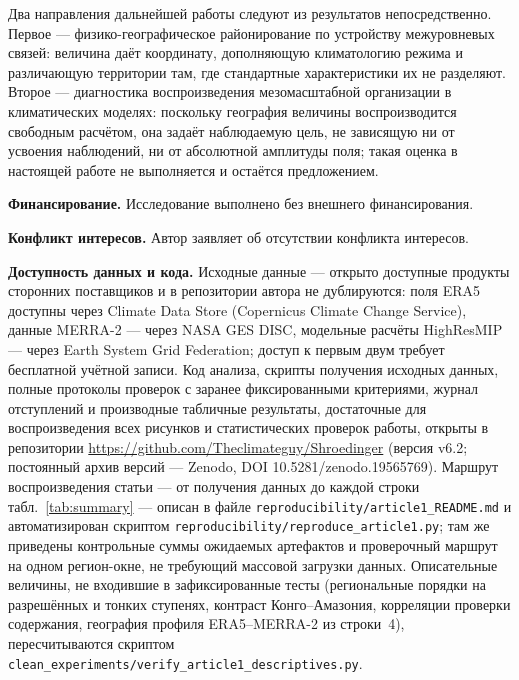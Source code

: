 \documentclass[11pt,a4paper]{article}
\begin{document}
Два направления дальнейшей работы следуют из результатов непосредственно. Первое --- физико-географическое районирование по устройству межуровневых связей: величина даёт координату, дополняющую климатологию режима и различающую территории там, где стандартные характеристики их не разделяют. Второе --- диагностика воспроизведения мезомасштабной организации в климатических моделях: поскольку география величины воспроизводится свободным расчётом, она задаёт наблюдаемую цель, не зависящую ни от усвоения наблюдений, ни от абсолютной амплитуды поля; такая оценка в настоящей работе не выполняется и остаётся предложением.

\bigskip
\noindent\textbf{Финансирование.} Исследование выполнено без внешнего финансирования.

\smallskip
\noindent\textbf{Конфликт интересов.} Автор заявляет об отсутствии конфликта интересов.

\smallskip
\noindent\textbf{Доступность данных и кода.} Исходные данные --- открыто доступные продукты сторонних поставщиков и в репозитории автора не дублируются: поля ERA5 доступны через Climate Data Store (Copernicus Climate Change Service), данные MERRA-2 --- через NASA GES DISC, модельные расчёты HighResMIP --- через Earth System Grid Federation; доступ к первым двум требует бесплатной учётной записи. Код анализа, скрипты получения исходных данных, полные протоколы проверок с заранее фиксированными критериями, журнал отступлений и производные табличные результаты, достаточные для воспроизведения всех рисунков и статистических проверок работы, открыты в репозитории \url{https://github.com/Theclimateguy/Shroedinger} (версия v6.2; постоянный архив версий --- Zenodo, DOI 10.5281/zenodo.19565769). Маршрут воспроизведения статьи --- от получения данных до каждой строки табл.~\ref{tab:summary} --- описан в файле \texttt{reproducibility/article1\_README.md} и автоматизирован скриптом \texttt{reproducibility/reproduce\_article1.py}; там же приведены контрольные суммы ожидаемых артефактов и проверочный маршрут на одном регион-окне, не требующий массовой загрузки данных. Описательные величины, не входившие в зафиксированные тесты (региональные порядки на разрешённых и тонких ступенях, контраст Конго--Амазония, корреляции проверки содержания, география профиля ERA5--MERRA-2 из строки~4), пересчитываются скриптом \texttt{clean\_experiments/verify\_article1\_descriptives.py}.

\printbibliography[title={Список литературы}]
\end{document}
